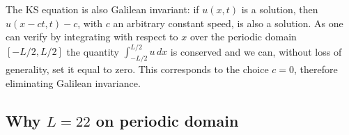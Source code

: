 The KS equation is also Galilean invariant: if $u(x,t)$ is a solution,
then $u(x -ct,t) -c $, with $c$ an arbitrary constant
speed, is also a solution. As one can verify by integrating  with
respect to $x$ over the periodic domain $[-L/2,L/2]$ the quantity
 $\int_{-L/2}^{L/2} u\,dx$
is conserved and we can, without loss of generality, set it equal to zero. This corresponds
to the choice $c=0$, therefore eliminating Galilean invariance.




\subsection{Why $L=22$ on periodic domain}
\label{sec:ksSizeBC}

